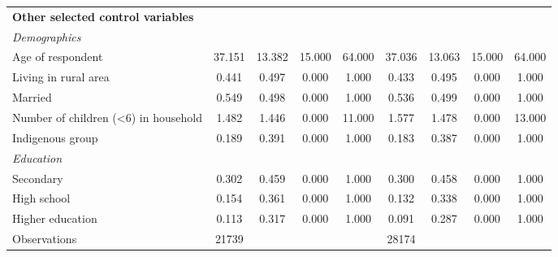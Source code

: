 \documentclass[12pt,english,british]{article}
\providecommand{\DIFdelbeginFL}{} %
\providecommand{\DIFdelendFL}{} %
\begin{document}
\begin{table}[h]
\begin{center}
\begin{adjustbox}{max width=\textwidth}
{\begin{tabular}{l*{2}{cccc}}
\textbf{Other selected control variables} &&&&&&&& \\
\hspace*{10mm}\emph{Demographics}&&&&&&&& \\
Age of respondent   &      37.151&      13.382&      15.000&      64.000&      37.036&      13.063&      15.000&      64.000\\
Living in rural area&       0.441&       0.497&       0.000&       1.000&       0.433&       0.495&       0.000&       1.000\\
Married             &       0.549&       0.498&       0.000&       1.000&       0.536&       0.499&       0.000&       1.000\\
Number of children (<6) in household&       1.482&       1.446&       0.000&      11.000&       1.577&       1.478&       0.000&      13.000\\
Indigenous group    &       0.189&       0.391&       0.000&       1.000&       0.183&       0.387&       0.000&       1.000\\
\hspace*{10mm}\emph{Education}&&&&&&&& \\
Secondary           &       0.302&       0.459&       0.000&       1.000&       0.300&       0.458&       0.000&       1.000\\
High school         &       0.154&       0.361&       0.000&       1.000&       0.132&       0.338&       0.000&       1.000\\
Higher education    &       0.113&       0.317&       0.000&       1.000&       0.091&       0.287&       0.000&       1.000\\
\midrule
Observations        &       21739&            &            &            &       28174&            &            &            \\
\bottomrule
\end{tabular}%
}
\end{adjustbox}
\end{center}
\DIFdelbeginFL %

\DIFdelendFL \end{table}
\end{document}

